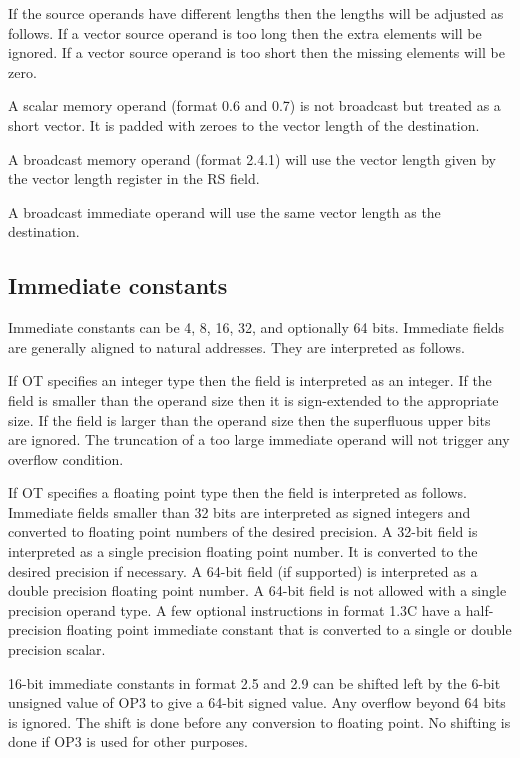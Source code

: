 \documentclass[forwardcom.tex]{subfiles}
\begin{document}
If the source operands have different lengths then the lengths will be adjusted as follows. If a vector source operand is too long then the extra elements will be ignored. If a vector source operand is too short then the missing elements will be zero.
\vspace{2mm}

A scalar memory operand (format 0.6 and 0.7) is not broadcast but treated as a short vector. It is padded with zeroes to the vector length of the destination.
\vspace{2mm}

A broadcast memory operand (format 2.4.1) will use the vector length given by the vector length register in the RS field.
\vspace{2mm}

A broadcast immediate operand will use the same vector length as the destination.

\subsection{Immediate constants}
Immediate constants can be 4, 8, 16, 32, and optionally 64 bits. Immediate fields are generally aligned to natural addresses. They are interpreted as follows.
\vspace{2mm}

If OT specifies an integer type then the field is interpreted as an integer. If the field is smaller than the operand size then it is sign-extended to the appropriate size. If the field is larger than the operand size then the superfluous upper bits are ignored. The truncation of a too large immediate operand will not trigger any overflow condition.
\vspace{2mm}

If OT specifies a floating point type then the field is interpreted as follows. Immediate fields smaller than 32 bits are interpreted as signed integers and converted to floating point numbers of the desired precision. A 32-bit field is interpreted as a single precision floating point number. It is converted to the desired precision if necessary. A 64-bit field (if supported) is interpreted as a double precision floating point number. A 64-bit field is not allowed with a single precision operand type. A few optional instructions in format 1.3C have a half-precision floating point immediate constant that is converted to a single or double precision scalar.
\vspace{2mm}

16-bit immediate constants in format 2.5 and 2.9 can be shifted left by the 6-bit unsigned value of OP3 to give a 64-bit signed value. Any overflow beyond 64 bits is ignored. The shift is done before any conversion to floating point. No shifting is done if OP3 is used for other purposes.
\vspace{2mm}
\end{document}
